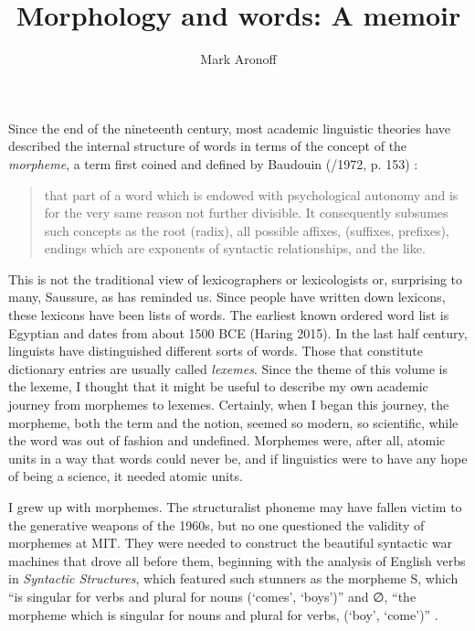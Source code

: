 \documentclass[output=paper]{langsci/langscibook}
\title{Morphology and words: A memoir}
\author{Mark Aronoff\affiliation{Stony Brook University}}
\begin{document}

Since the end of the nineteenth century, most academic linguistic
theories have described the internal structure of words in terms of the
concept of the \emph{morpheme}, a term first coined and defined by
%
Baudouin 
\citeauthor{Baudouin1895} (\citeyear{Baudouin1895}/1972, p. 153)%
%
:

\begin{quote}
that part of a word which is endowed with psychological autonomy and is
for the very same reason not further divisible. It consequently subsumes
such concepts as the root (radix), all possible affixes, (suffixes,
prefixes), endings which are exponents of syntactic relationships, and
the like.
\end{quote}

This is not the traditional view of lexicographers or lexicologists or,
surprising to many, Saussure, as %
\citet{Anderson15} %
%
has reminded us. Since
people have written down lexicons, these lexicons have been lists of
words. The earliest known ordered word list is Egyptian and dates from
about 1500 BCE (Haring 2015). In the last half century, linguists have
distinguished different sorts of words. Those that constitute dictionary
entries are usually called \emph{lexemes}. Since the theme of this
volume is the lexeme, I thought that it might be useful to describe my
own academic journey from morphemes to lexemes. Certainly, when I began
this journey, the morpheme, both the term and the notion, seemed so
modern, so scientific, while the word was out of fashion and undefined.
Morphemes were, after all, atomic units in a way that words could never
be, and if linguistics were to have any hope of being a science, it
needed atomic units.

I grew up with morphemes. The structuralist phoneme may have fallen
victim to the generative weapons of the 1960s, but no one questioned
the validity of morphemes at MIT. They were needed to construct the
beautiful syntactic war machines that drove all before them, beginning
with the analysis of English verbs in \emph{Syntactic Structures}, which
featured such stunners as the morpheme S, which ``is singular for verbs
and plural for nouns (`comes', `boys')'' and ∅, ``the morpheme which is
singular for nouns and plural for verbs, (`boy', `come')'' %
\citep[29, fn. 3]{Chomsky1957}%
%
.
\end{document}

